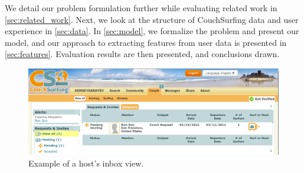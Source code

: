 We detail our problem formulation further while evaluating related work in \autoref{sec:related_work}.
Next, we look at the structure of CouchSurfing data and user experience in \autoref{sec:data}.
In \autoref{sec:model}, we formalize the problem and present our model, and our approach to extracting features from user data is presented in \autoref{sec:features}.
Evaluation results are then presented, and conclusions drawn.

\begin{figure}[ht]
\centering
\includegraphics[width=0.8\linewidth]{figures/screenshots/requests.png}
\caption{Example of a host's inbox view.}
\label{fig:sample_request}
\end{figure}

